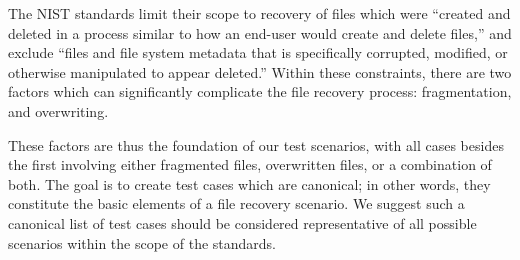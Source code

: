The NIST standards limit their scope to recovery of files which were ``created and deleted in a process similar to how an end-user would create and delete files,''\cite{meta:dfr:standards} and exclude ``files and file system metadata that is specifically corrupted, modified, or otherwise manipulated to appear deleted.''\cite{meta:dfr:standards}
Within these constraints, there are two factors which can significantly complicate the file recovery process: fragmentation, and overwriting. 

These factors are thus the foundation of our test scenarios, with all cases besides the first involving either fragmented files, overwritten files, or a combination of both. 
The goal is to create test cases which are canonical; in other words, they constitute the basic elements of a file recovery scenario.
We suggest such a canonical list of test cases should be considered representative of all possible scenarios within the scope of the standards.

